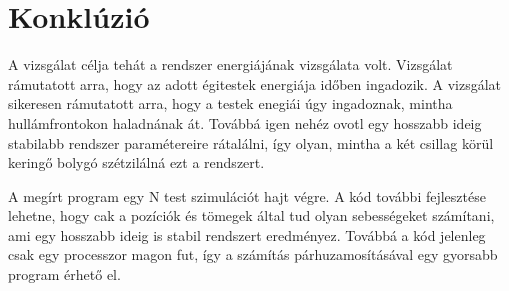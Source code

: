 \section{Konklúzió}
A vizsgálat célja tehát a rendszer energiájának vizsgálata volt. Vizsgálat rámutatott arra, hogy az adott égitestek energiája időben ingadozik. A vizsgálat sikeresen rámutatott arra, hogy a testek enegiái úgy ingadoznak, mintha hullámfrontokon haladnának át. Továbbá igen nehéz ovotl egy hosszabb ideig stabilabb rendszer paramétereire rátalálni, így olyan, mintha a két csillag körül keringő bolygó szétzilálná ezt a rendszert. 

A megírt program egy N test szimulációt hajt végre. A kód további fejlesztése lehetne, hogy cak a pozíciók és tömegek által tud olyan sebességeket számítani, ami egy hosszabb ideig is stabil rendszert eredményez. Továbbá a kód jelenleg csak egy processzor magon fut, így a számítás párhuzamosításával egy gyorsabb program érhető el.